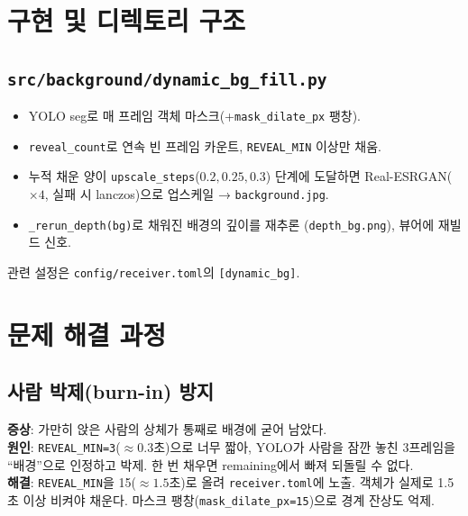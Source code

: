 \chapter{구현 및 디렉토리 구조}

\section{\texttt{src/background/dynamic\_bg\_fill.py}}
\begin{itemize}
  \item YOLO seg로 매 프레임 객체 마스크(+\texttt{mask\_dilate\_px} 팽창).
  \item \texttt{reveal\_count}로 연속 빈 프레임 카운트, \texttt{REVEAL\_MIN} 이상만 채움.
  \item 누적 채운 양이 \texttt{upscale\_steps}($0.2, 0.25, 0.3$) 단계에 도달하면
        Real-ESRGAN($\times4$, 실패 시 lanczos)으로 업스케일 → \texttt{background.jpg}.
  \item \texttt{\_rerun\_depth(bg)}로 채워진 배경의 깊이를 재추론
        (\texttt{depth\_bg.png}), 뷰어에 재빌드 신호.
\end{itemize}
관련 설정은 \texttt{config/receiver.toml}의 \texttt{[dynamic\_bg]}.

\chapter{문제 해결 과정}

\section{사람 박제(burn-in) 방지}
\textbf{증상}: 가만히 앉은 사람의 상체가 통째로 배경에 굳어 남았다.\\
\textbf{원인}: \texttt{REVEAL\_MIN=3}($\approx0.3$초)으로 너무 짧아, YOLO가 사람을
잠깐 놓친 3프레임을 ``배경''으로 인정하고 박제. 한 번 채우면 remaining에서
빠져 되돌릴 수 없다.\\
\textbf{해결}: \texttt{REVEAL\_MIN}을 15($\approx1.5$초)로 올려 \texttt{receiver.toml}에
노출. 객체가 실제로 1.5초 이상 비켜야 채운다. 마스크 팽창(\texttt{mask\_dilate\_px=15})으로
경계 잔상도 억제.
